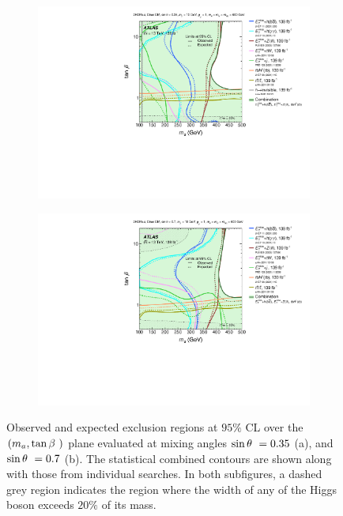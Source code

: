 \begin{figure}[h!]
    \centering
    \begin{subfigure}[2]{0.495\textwidth}
        \centering
        \includegraphics[width=\linewidth]{figures/fig_06a.pdf}
        \caption{}
        \label{fig:result-ma-tanb-scan-a}
    \end{subfigure}
    \begin{subfigure}[2]{0.495\textwidth}
        \centering
        \includegraphics[width=\linewidth]{figures/fig_06b.pdf}
        \caption{}
        \label{fig:result-ma-tanb-scan-b}
    \end{subfigure}
    \caption{Observed and expected exclusion regions at $95\%$ CL over the $(m_a, \tan\beta~)$ plane evaluated at \thdma mixing angles $\sin\theta~=0.35$ (a), and $\sin\theta~=0.7$ (b). The statistical combined contours are shown along with those from individual searches. In both subfigures, a dashed grey region indicates the region where the width of any of the Higgs boson exceeds $20\%$ of its mass. }
    \label{fig:result-ma-tanb-scan}
\end{figure} 

